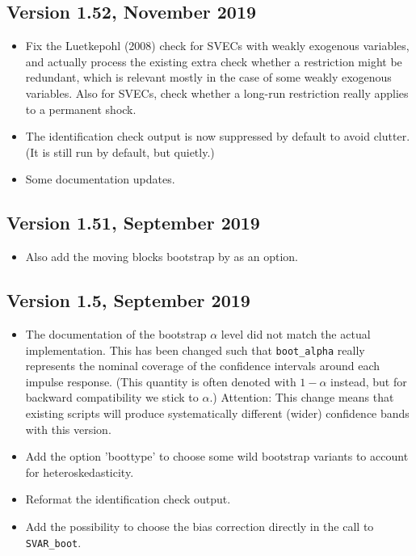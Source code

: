 \documentclass[a4paper,10pt]{article}
\newcounter{script}[section]
\begin{document}
\subsection*{Version 1.52, November 2019}
\begin{itemize}
\item Fix the Luetkepohl (2008) check for SVECs with weakly exogenous variables,
and actually process the existing extra check whether a restriction might be redundant,
which is relevant mostly in the case of some weakly exogenous variables.
Also for SVECs, check whether a long-run restriction really applies to a permanent shock.

\item The identification check output is now suppressed by default to avoid clutter.
(It is still run by default, but quietly.)

\item Some documentation updates.

\end{itemize}


\subsection*{Version 1.51, September 2019}
\begin{itemize}
\item Also add the moving blocks bootstrap by \cite{BrugJenTrenk16} as an option.
\end{itemize}

\subsection*{Version 1.5, September 2019}
\begin{itemize}

\item The documentation of the bootstrap $\alpha$ level did not match the actual
implementation. This has been changed such that \texttt{boot\_alpha} really 
represents the nominal coverage of the confidence intervals around each impulse
response. (This quantity is often denoted with $1 - \alpha$ instead, but for 
backward compatibility we stick to $\alpha$.)
Attention: This change means that existing scripts will produce systematically 
different (wider) confidence bands with this version.

\item Add the option 'boottype' to choose some wild bootstrap variants to account for 
heteroskedasticity.

\item Reformat the identification check output.

\item Add the possibility to choose the bias correction directly in the call to \texttt{SVAR\_boot}.

\end{itemize}
\end{document}

